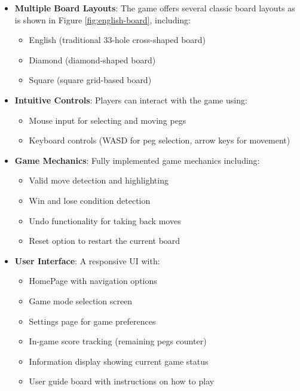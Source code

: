 \begin{itemize}
    \item \textbf{Multiple Board Layouts}:
    The game offers several classic board layouts as is shown in Figure \ref{fig:english-board}, including:
    \begin{itemize}
        \item English (traditional 33-hole cross-shaped board)
        \item Diamond (diamond-shaped board)
        \item Square (square grid-based board)
    \end{itemize}
    
    \item \textbf{Intuitive Controls}: Players can interact with the game using:
    \begin{itemize}
        \item Mouse input for selecting and moving pegs
        \item Keyboard controls (WASD for peg selection, arrow keys for movement)
    \end{itemize}
    
    \item \textbf{Game Mechanics}: Fully implemented game mechanics including:
    \begin{itemize}
        \item Valid move detection and highlighting
        \item Win and lose condition detection
        \item Undo functionality for taking back moves
        \item Reset option to restart the current board
    \end{itemize}
    
    \item \textbf{User Interface}: A responsive UI with:
    \begin{itemize}
        \item HomePage with navigation options
        \item Game mode selection screen
        \item Settings page for game preferences
        \item In-game score tracking (remaining pegs counter)
        \item Information display showing current game status
        \item User guide board with instructions on how to play
    \end{itemize}
\end{itemize}

